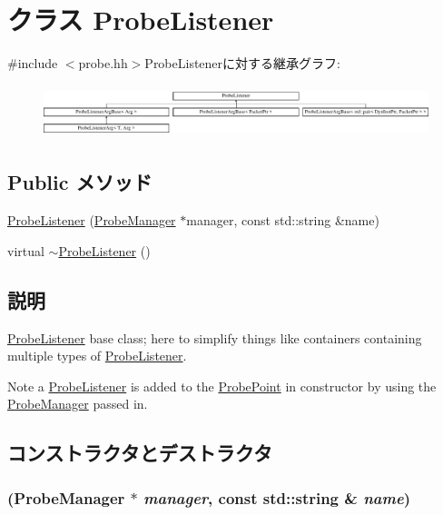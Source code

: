 \hypertarget{classProbeListener}{
\section{クラス ProbeListener}
\label{classProbeListener}
}


{\ttfamily \#include $<$probe.hh$>$}ProbeListenerに対する継承グラフ:\begin{figure}[H]
\begin{center}
\leavevmode
\includegraphics[height=1.55125cm]{classProbeListener}
\end{center}
\end{figure}
\subsection*{Public メソッド}
\begin{DoxyCompactItemize}
\item 
\hyperlink{classProbeListener_a76e494589083c3953ca39634369bc29b}{ProbeListener} (\hyperlink{classProbeManager}{ProbeManager} $\ast$manager, const std::string \&name)
\item 
virtual \hyperlink{classProbeListener_ac26e1b05050a3b59bf16a81d372c7de6}{$\sim$ProbeListener} ()
\end{DoxyCompactItemize}


\subsection{説明}
\hyperlink{classProbeListener}{ProbeListener} base class; here to simplify things like containers containing multiple types of \hyperlink{classProbeListener}{ProbeListener}.

Note a \hyperlink{classProbeListener}{ProbeListener} is added to the \hyperlink{classProbePoint}{ProbePoint} in constructor by using the \hyperlink{classProbeManager}{ProbeManager} passed in. 

\subsection{コンストラクタとデストラクタ}
\hypertarget{classProbeListener_a76e494589083c3953ca39634369bc29b}{
\subsubsection[{ProbeListener}]{ ({\bf ProbeManager} $\ast$ {\em manager}, \/  const std::string \& {\em name})}}
\label{classProbeListener_a76e494589083c3953ca39634369bc29b}



